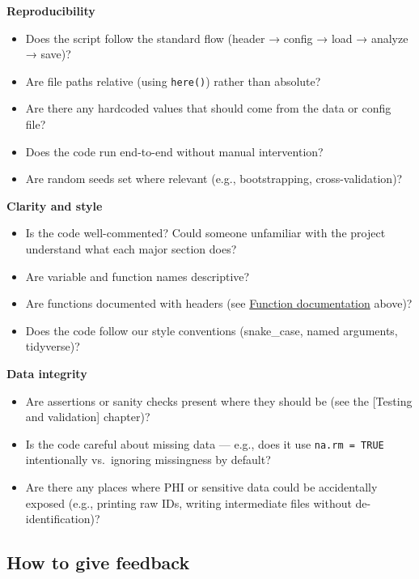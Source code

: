 \documentclass[
]{book}
\providecommand{\tightlist}{%
  \setlength{\itemsep}{0pt}\setlength{\parskip}{0pt}}
\begin{document}
\textbf{Reproducibility}

\begin{itemize}
\tightlist
\item
  Does the script follow the standard flow (header → config → load → analyze → save)?
\item
  Are file paths relative (using \texttt{here()}) rather than absolute?
\item
  Are there any hardcoded values that should come from the data or config file?
\item
  Does the code run end-to-end without manual intervention?
\item
  Are random seeds set where relevant (e.g., bootstrapping, cross-validation)?
\end{itemize}

\textbf{Clarity and style}

\begin{itemize}
\tightlist
\item
  Is the code well-commented? Could someone unfamiliar with the project understand what each major section does?
\item
  Are variable and function names descriptive?
\item
  Are functions documented with headers (see \hyperref[function-documentation]{Function documentation} above)?
\item
  Does the code follow our style conventions (snake\_case, named arguments, tidyverse)?
\end{itemize}

\textbf{Data integrity}

\begin{itemize}
\tightlist
\item
  Are assertions or sanity checks present where they should be (see the {[}Testing and validation{]} chapter)?
\item
  Is the code careful about missing data --- e.g., does it use \texttt{na.rm\ =\ TRUE} intentionally vs.~ignoring missingness by default?
\item
  Are there any places where PHI or sensitive data could be accidentally exposed (e.g., printing raw IDs, writing intermediate files without de-identification)?
\end{itemize}

\subsection{How to give feedback}\label{how-to-give-feedback}
\end{document}
